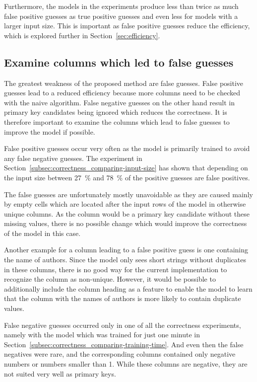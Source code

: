 Furthermore, the models in the experiments produce less than twice as much false positive guesses as true positive guesses and even less for models with a larger input size. This is important as false positive guesses reduce the efficiency, which is explored further in Section~\ref{sec:efficiency}. %



\subsection{Examine columns which led to false guesses}\label{subsec:correctness_examine-false-guesses} %
The greatest weakness of the proposed method are false guesses. False positive guesses lead to a reduced efficiency because more columns need to be checked with the naive algorithm. False negative guesses on the other hand result in primary key candidates being ignored which reduces the correctness. It is therefore important to examine the columns which lead to false guesses to improve the model if possible.

False positive guesses occur very often as the model is primarily trained to avoid any false negative guesses. The experiment in Section~\ref{subsec:correctness_comparing-input-size} has shown that depending on the input size between \SI{27}{\percent} and \SI{78}{\percent} of the positive guesses are false positives.

The false guesses are unfortunately mostly unavoidable as they are caused mainly by empty cells which are located after the input rows of the model in otherwise unique columns. As the column would be a primary key candidate without these missing values, there is no possible change which would improve the correctness of the model in this case.

Another example for a column leading to a false positive guess is one containing the name of authors. Since the model only sees short strings without duplicates in these columns, there is no good way for the current implementation to recognize the column as non-unique. However, it would be possible to additionally include the column heading as a feature to enable the model to learn that the column with the names of authors is more likely to contain duplicate values.

False negative guesses occurred only in one of all the correctness experiments, namely with the model which was trained for just one minute in Section~\ref{subsec:correctness_comparing-training-time}. And even then the false negatives were rare, and the corresponding columns contained only negative numbers or numbers smaller than 1. While these columns are negative, they are not suited very well as primary keys. %

